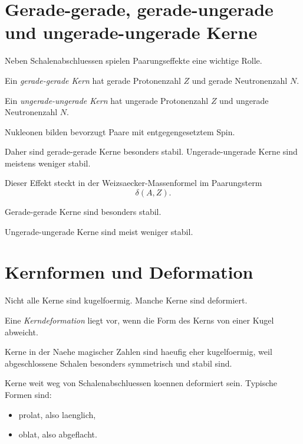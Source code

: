 \section{Gerade-gerade, gerade-ungerade und ungerade-ungerade Kerne}

Neben Schalenabschluessen spielen Paarungseffekte eine wichtige Rolle.

\begin{definitionbox}
Ein \emph{gerade-gerade Kern} hat gerade Protonenzahl $Z$ und gerade Neutronenzahl $N$.

Ein \emph{ungerade-ungerade Kern} hat ungerade Protonenzahl $Z$ und ungerade
Neutronenzahl $N$.
\end{definitionbox}

\begin{conceptbox}
Nukleonen bilden bevorzugt Paare mit entgegengesetztem Spin.

Daher sind gerade-gerade Kerne besonders stabil.
Ungerade-ungerade Kerne sind meistens weniger stabil.
\end{conceptbox}

\begin{notebox}
Dieser Effekt steckt in der Weizsaecker-Massenformel im Paarungsterm
\begin{equation*}
    \delta(A,Z).
\end{equation*}
\end{notebox}

\begin{examtipbox}
Gerade-gerade Kerne sind besonders stabil.

Ungerade-ungerade Kerne sind meist weniger stabil.
\end{examtipbox}

\section{Kernformen und Deformation}

Nicht alle Kerne sind kugelfoermig.
Manche Kerne sind deformiert.

\begin{definitionbox}
Eine \emph{Kerndeformation} liegt vor, wenn die Form des Kerns von einer Kugel
abweicht.
\end{definitionbox}

\begin{conceptbox}
Kerne in der Naehe magischer Zahlen sind haeufig eher kugelfoermig, weil
abgeschlossene Schalen besonders symmetrisch und stabil sind.

Kerne weit weg von Schalenabschluessen koennen deformiert sein.
Typische Formen sind:
\begin{itemize}
    \item prolat, also laenglich,
    \item oblat, also abgeflacht.
\end{itemize}
\end{conceptbox}

